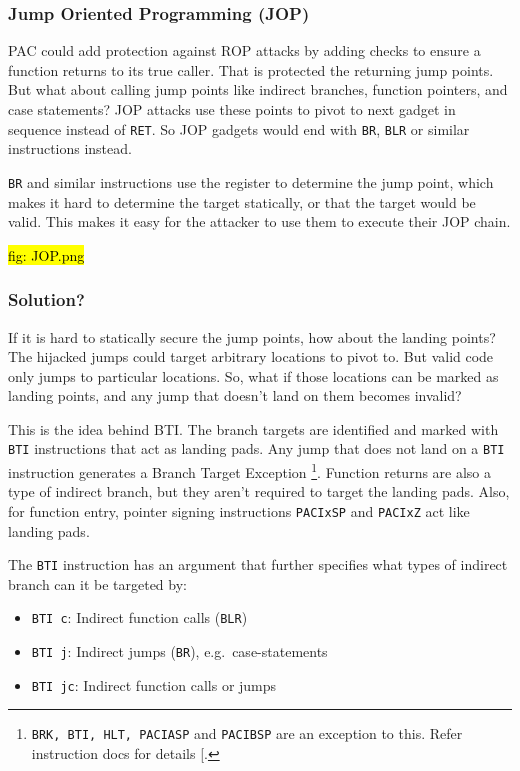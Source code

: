 \documentclass[a4paper, nobind]{templates/ociamthesis}
\providecommand{\tightlist}{%
  \setlength{\itemsep}{0pt}\setlength{\parskip}{0pt}}
\begin{document}
\subsubsection{Jump Oriented Programming (JOP)}\label{jump-oriented-programming-jop}

PAC could add protection against ROP attacks by adding checks to ensure a
function returns to its true caller. That is protected the returning jump points.
But what about calling jump points like indirect branches, function pointers,
and case statements? JOP attacks use these points to pivot to next gadget in
sequence instead of \texttt{RET}. So JOP gadgets would end with \texttt{BR}, \texttt{BLR} or similar instructions instead.

\texttt{BR} and similar instructions use the register to determine the jump point, which
makes it hard to determine the target statically, or that the target would be valid.
This makes it easy for the attacker to use them to execute their JOP chain.

\hl{fig: JOP.png}

\subsubsection{Solution?}\label{solution-1}

If it is hard to statically secure the jump points, how about the landing points?
The hijacked jumps could target arbitrary locations to pivot to.
But valid code only jumps to particular locations. So, what if those locations
can be marked as landing points, and any jump that doesn't land on them becomes invalid?

This is the idea behind BTI. The branch targets are identified and marked with \texttt{BTI}
instructions that act as landing pads. Any jump that does not land on a \texttt{BTI} instruction
generates a Branch Target Exception \footnote{\texttt{BRK,\ BTI,\ HLT,\ PACIASP} and \texttt{PACIBSP} are an exception to this.
  Refer instruction docs for details {[}\citeproc{ref-armasm-user-guide}{8}{]}.}.
Function returns are also a type of indirect branch, but they aren't required
to target the landing pads. Also, for function entry,
pointer signing instructions \texttt{PACIxSP} and \texttt{PACIxZ} act like landing pads.

The \texttt{BTI} instruction has an argument that further specifies what types of indirect branch can it be targeted by:

\begin{itemize}
\tightlist
\item
  \texttt{BTI\ c}: Indirect function calls (\texttt{BLR})
\item
  \texttt{BTI\ j}: Indirect jumps (\texttt{BR}), e.g.~case-statements
\item
  \texttt{BTI\ jc}: Indirect function calls or jumps
\end{itemize}
\end{document}

